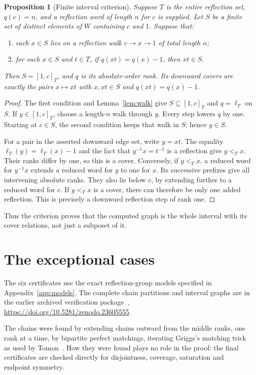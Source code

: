 \documentclass[11pt]{article}
\newtheorem{proposition}[theorem]{Proposition}
\theoremstyle{definition}
\begin{document}
\begin{proposition}[Finite interval criterion]\label{prop:criterion}
Suppose $T$ is the entire reflection set, $q(c)=n$, and a reflection
word of length $n$ for $c$ is supplied. Let $S$ be a finite set of
distinct elements of $W$ containing $c$ and $1$. Suppose that:
\begin{enumerate}
\item each $x\in S$ lies on a reflection walk $c\to x\to1$ of total
      length $n$;
\item for each $x\in S$ and $t\in T$, if $q(xt)=q(x)-1$, then
      $xt\in S$.
\end{enumerate}
Then $S=[1,c]_T$, and $q$ is its absolute-order rank. Its downward
covers are exactly the pairs $x\longmapsto xt$ with $x,xt\in S$ and
$q(xt)=q(x)-1$.
\end{proposition}
\begin{proof}
The first condition and Lemma~\ref{lem:walk} give
$S\subseteq[1,c]_T$ and $q=\ell_T$ on $S$. If $y\in[1,c]_T$,
choose a length-$n$ walk through $y$. Every step lowers $q$ by one.
Starting at $c\in S$, the second condition keeps that walk in $S$;
hence $y\in S$.

For a pair in the asserted downward edge set, write $y=xt$.
The equality $\ell_T(y)=\ell_T(x)-1$ and the fact that
$y^{-1}x=t^{-1}$ is a reflection give $y<_T x$. Their ranks differ
by one, so this is a cover. Conversely, if $y<_T x$, a reduced word
for $y^{-1}x$ extends a reduced word for $y$ to one for $x$.
Its successive prefixes give all intervening absolute ranks. They
also lie below $c$, by extending further to a reduced word for $c$.
If $y<_T x$ is a cover, there can therefore be only one added
reflection. This is precisely a downward reflection step of rank one.
\end{proof}

Thus the criterion proves that the computed graph is the whole
interval with its cover relations, not just a subposet of it.

\section{The exceptional cases}\label{sec:models}
The six certificates use the exact reflection-group models specified
in Appendix~\ref{app:models}.
The complete chain partitions and interval graphs are in the
earlier archived verification package~\cite{Archive},
\url{https://doi.org/10.5281/zenodo.23605555}.

The chains were found by extending chains outward from the middle
ranks, one rank at a time, by bipartite perfect matchings, iterating
Griggs's matching trick \cite{Griggs} as used by
Tomon~\cite[\mbox{\S\S3--4}]{Tomon}. How they were found plays no role in the
proof: the final certificates are checked directly for disjointness,
coverage, saturation and endpoint symmetry.
\end{document}
